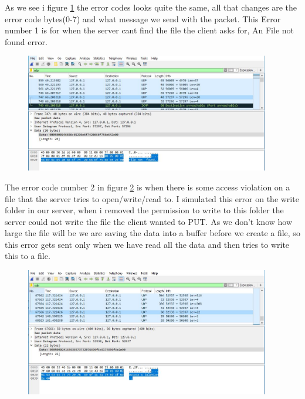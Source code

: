 \documentclass[a4paper,12pt]{article}
\numberwithin{figure}{section}
\begin{document}
\noindent As we see i figure \ref{error 1} the error codes looks quite the same, all that changes are the error code bytes(0-7) and what message we send with the packet. This Error number 1 is for when the server cant find the file the client asks for, An File not found error.

\begin{figure}[h!]
	\centering
	\includegraphics[width=0.95\textwidth,keepaspectratio]{img/error1.jpg} 
	\caption{}
	\label{error 1}
\end{figure}

\noindent The error code number 2 in figure \ref{error 2} is when there is some access violation on a file that the server tries to open/write/read to. I simulated this error on the write folder in our server, when i removed the permission to write to this folder the server could not write the file the client wanted to PUT. As we don't know how large the file will be we are saving the data into a buffer before we create a file, so this error gets sent only when we have read all the data and then tries to write this to a file.

\begin{figure}[h!]
	\centering
	\includegraphics[width=0.95\textwidth,keepaspectratio]{img/error2.jpg} 
	\caption{}
	\label{error 2}
\end{figure}
\end{document}
